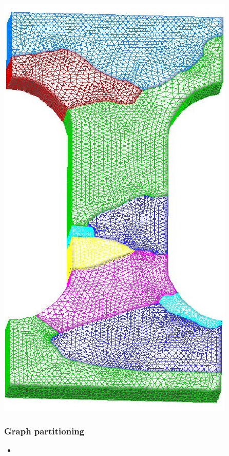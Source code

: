 \begin{frame}[fragile]
\begin{minipage}{.17\linewidth}
    \includegraphics[scale=0.3]{figures/mesh-dogbone.pdf}
  \end{minipage} 
%
\end{frame}

\begin{frame}[fragile]
%
  \frametitle{Graph partitioning}
%
  \begin{itemize}
%
  \item 
%
  \end{itemize}
%
\end{frame}

